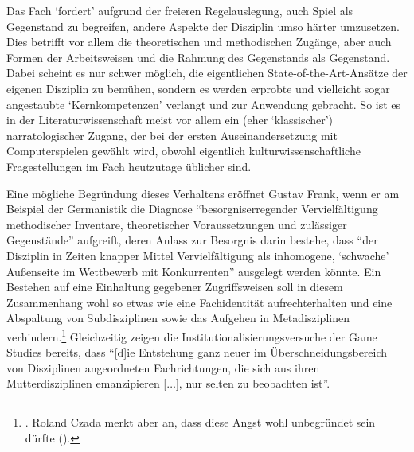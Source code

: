 \documentclass{scrartcl}
\begin{document}
Das Fach \enquote*{fordert} aufgrund der freieren Regelauslegung, auch Spiel als Gegenstand zu begreifen, andere Aspekte der Disziplin umso härter umzusetzen.
Dies betrifft vor allem die theoretischen und methodischen Zugänge, aber auch Formen der Arbeitsweisen und die Rahmung des Gegenstands als Gegenstand.
Dabei scheint es nur schwer möglich, die eigentlichen State-of-the-Art-Ansätze der eigenen Disziplin zu bemühen, sondern es werden erprobte und vielleicht sogar angestaubte \enquote*{Kernkompetenzen} verlangt und zur Anwendung gebracht.
So ist es in der Literaturwissenschaft meist vor allem ein (eher \enquote*{klassischer}) narratologischer Zugang, der bei der ersten Auseinandersetzung mit Computerspielen gewählt wird, obwohl eigentlich kulturwissenschaftliche Fragestellungen im Fach heutzutage üblicher sind.

Eine mögliche Begründung dieses Verhaltens eröffnet Gustav Frank, wenn er am Beispiel der Germanistik die Diagnose \enquote{besorgniserregender Vervielfältigung methodischer Inventare, theoretischer Voraussetzungen und zulässiger Gegenstände} aufgreift, deren Anlass zur Besorgnis darin bestehe, dass \enquote{der Disziplin in Zeiten knapper Mittel Vervielfältigung als inhomogene, \enquote{schwache} Außenseite im Wettbewerb mit Konkurrenten} ausgelegt werden könnte.\autocite[][S.~61]{frank_problemlosen_2000}
Ein Bestehen auf eine Einhaltung gegebener Zugriffsweisen soll in diesem Zusammenhang wohl so etwas wie eine Fachidentität aufrechterhalten und eine Abspaltung von Subdisziplinen sowie das Aufgehen in Metadisziplinen verhindern.\footnote{\autocite[Vgl.][S.~76]{frank_problemlosen_2000}. Roland Czada merkt aber an, dass diese Angst wohl unbegründet sein dürfte (\autocite[vgl.][S.~39]{czada_disziplinare_2002}).}
Gleichzeitig zeigen die Institutionalisierungsversuche der Game Studies bereits, dass \enquote{[d]ie Entstehung ganz neuer im Überschneidungsbereich von Disziplinen angeordneten Fachrichtungen, die sich aus ihren Mutterdisziplinen emanzipieren [$\ldots$], nur selten zu beobachten ist}.\autocite[][S.~26]{czada_disziplinare_2002}
\end{document}
